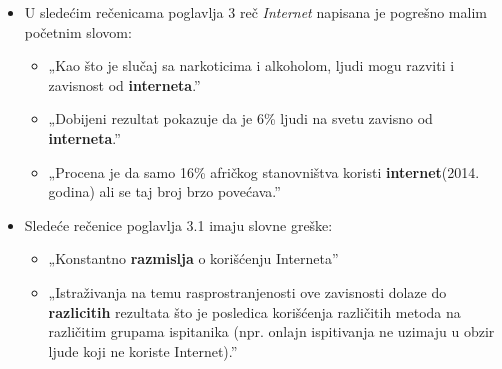 \documentclass[a4paper]{report}
\newcommand{\odgovor}[1]{\textcolor{blue}{#1}}
\begin{document}
\begin{itemize}
    \item U sledećim rečenicama poglavlja 3 reč \textit{Internet} napisana je pogrešno malim početnim slovom:\newline
    \begin{itemize}
        \item  „Kao što je slučaj sa narkoticima i alkoholom, ljudi mogu razviti i zavisnost od \textbf{interneta}.”
        
        \odgovor{}
        
    \end{itemize}
    \begin{itemize}
        \item „Dobijeni rezultat pokazuje da je 6\% ljudi na svetu zavisno od \textbf{interneta}.”
        
        \odgovor{}
        
        
    \end{itemize}
    \begin{itemize}
        \item  „Procena je da samo 16\% afričkog stanovništva koristi \textbf{internet}(2014. godina) ali se taj broj brzo povećava.”
        
        \odgovor{}
        
    \end{itemize}
\end{itemize}
\begin{itemize}
    \item  Sledeće rečenice poglavlja 3.1 imaju slovne greške:
    
    \odgovor{}
    
    \begin{itemize}
        \item „Konstantno \textbf{razmislja} o korišćenju Interneta”
        
        \odgovor{}
        
    \end{itemize}
    \begin{itemize}
        \item „Istraživanja na temu rasprostranjenosti ove zavisnosti dolaze do 
        \textbf{razlicitih} rezultata što je posledica korišćenja različitih metoda na različitim grupama ispitanika (npr. onlajn ispitivanja ne uzimaju u obzir ljude koji ne koriste Internet).”
        
        \odgovor{}
        
    \end{itemize}
\end{itemize}
\end{document}

